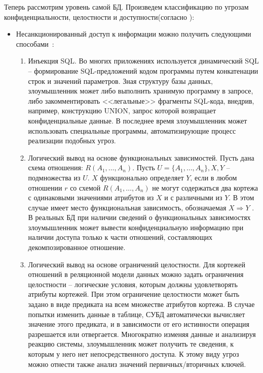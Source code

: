 Теперь рассмотрим уровень самой БД. Произведем классификацию по угрозам конфиденциальности, целостности и доступности(согласно \autocite{Ytebov2008}):
\begin{itemize}

Наиболее распространенная угроза для конфиденциальноти - это несанкционированный доступ \autocite[сс. 21]{Skakun}.
Несанкционированный доступ - это  получение пользователем (нарушителем) доступа к объекту в нарушение правил разграничения доступа, установленных в соответствии с принятой в организации политикой безопасности \autocite[сс. 21]{Skakun}.

	\item Несанкционированный доступ к информации можно получить следующими способами~\label{ugr:conf}:
	\begin{enumerate}
		\item Инъекция SQL. Во многих приложениях используется динамический SQL -- формирование SQL-предложений кодом программы путем конкатенации строк и значений параметров. Зная структуру базы данных, злоумышленник может либо выполнить хранимую программу в запросе, либо закомментировать <<легальные>> фрагменты SQL-кода, внедрив, например, конструкцию UNION, запрос которой возвращает конфиденциальные данные. В последнее время злоумышленник может использовать специальные программы, автоматизирующие процесс реализации подобных угроз.

		\item Логический вывод на основе функциональных зависимостей. Пусть дана схема отношения: $R(A_1,\ldots,A_n)$. Пусть $U = \{A_1,\ldots,A_n\}, X ,Y$ -- подмножества из $U$. $X$ функционально определяет $Y$, если в любом отношении $r$ со схемой $R(A_1,\ldots,A_n)$ не могут содержаться два кортежа с одинаковыми значениями атрибутов из $X$ и с различными из $Y$. В этом случае имеет место функциональная зависимость, обозначаемая $X \Rightarrow Y$ . В реальных БД при наличии сведений о функциональных зависимостях злоумышленник может вывести конфиденциальную информацию при наличии доступа только к части отношений, составляющих декомпозированное отношение.

		\item Логический вывод на основе ограничений целостности. Для кортежей отношений в реляционной модели данных можно задать ограничения целостности -- логические условия, которым должны удовлетворять атрибуты кортежей. При этом ограничение целостности может быть задано в виде предиката на всем множестве атрибутов кортежа. В случае попытки изменить данные в таблице, СУБД автоматически вычисляет значение этого предиката, и в зависимости от его истинности операция разрешается или отвергается. Многократно изменяя данные и анализируя реакцию системы, злоумышленник может получить те сведения, к которым	у него нет непосредственного доступа. К этому виду угроз можно отнести также анализ значений первичных/вторичных ключей.


\end{enumerate}
\end{itemize}
